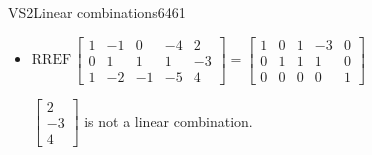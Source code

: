 \begin{exercise}{VS2}{Linear combinations}{6461}
\begin{exerciseAnswer}
\begin{itemize}
 

 \(\left[\begin{array}{c}
3 \\
-2 \\
5
\end{array}\right]\) is a linear combination, for example: \(
1 \left[\begin{array}{c}
1 \\
0 \\
1
\end{array}\right] + -2 \left[\begin{array}{c}
-1 \\
1 \\
-2
\end{array}\right] = \left[\begin{array}{c}
3 \\
-2 \\
5
\end{array}\right]
                            \) 

 
\item  

 \(
\mathrm{RREF}\, \left[\begin{array}{cccc|c}
1 & -1 & 0 & -4 & 2 \\
0 & 1 & 1 & 1 & -3 \\
1 & -2 & -1 & -5 & 4
\end{array}\right] = \left[\begin{array}{cccc|c}
1 & 0 & 1 & -3 & 0 \\
0 & 1 & 1 & 1 & 0 \\
0 & 0 & 0 & 0 & 1
\end{array}\right]
                        \) 

 

 \(\left[\begin{array}{c}
2 \\
-3 \\
4
\end{array}\right]\) is not a linear combination. 

 
\end{itemize}

     \end{exerciseAnswer}
 \end{exercise}


